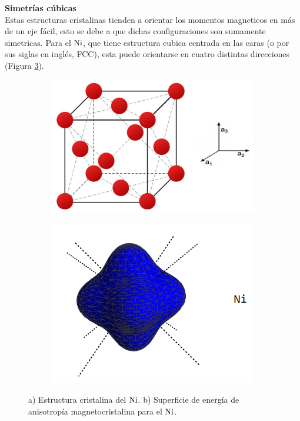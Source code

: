\textbf{Simetrías cúbicas}\\
Estas estructuras cristalinas tienden a orientar los momentos magneticos en más de un eje fácil, esto se debe a que dichas configuraciones son sumamente simetricas. Para el $\ce{Ni}$, que tiene estructura cubica centrada en las caras (o por sus siglas en inglés, FCC), esta puede orientarse en cuatro distintas direcciones (Figura \ref{fig:niquel}).
\begin{figure}[!hpt]
    \centering
    \begin{subfigure}[b]{0.45\textwidth}
        \includegraphics[scale=0.45]{Figuras/Crystal-fcc.png}
        \caption{}
        \label{fig:fcc}
    \end{subfigure}
    \begin{subfigure}[b]{0.4\textwidth}
        \includegraphics[scale=0.35]{Figuras/MagnetocrystallineNi.png}
        \caption{}
        \label{fig:anisotropyfcc}
    \end{subfigure}
    \renewcommand{\figurename}{\textbf{Figura}}
    \renewcommand\thefigure{\textbf{\arabic{figure}}}
    \caption{a) Estructura cristalina del $\ce{Ni}$. b) Superficie de energía de anisotropía magnetocristalina para el $\ce{Ni}$.}
    \label{fig:niquel}
\end{figure}

